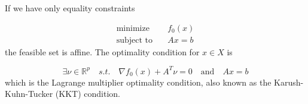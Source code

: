 If we have only equality constraints

\begin{equation}
    \begin{aligned}
        \text{minimize} \quad & f_0(x) \\
        \text{subject to} \quad & Ax=b
    \end{aligned}
\end{equation}
%
the feasible set is affine. The optimality condition for $x \in X$ is

\begin{equation}
    \exists\nu\in\mathbb{R}^p \quad s.t. \quad \nabla f_0(x) + A^T\nu = 0 \quad \text{and} \quad Ax=b
\end{equation}
%
which is the Lagrange multiplier optimality condition, also known as the Karush-Kuhn-Tucker (KKT) condition.
